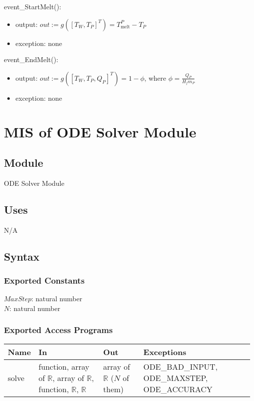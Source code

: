 \documentclass[12pt]{article}
\begin{document}
event\_StartMelt(): 
\begin{itemize}
\item output: $out := g([T_W, T_P]^T) = T_\text{melt}^P - T_P$
\item exception: none
\end{itemize}

event\_EndMelt(): 
\begin{itemize}
\item output: $out := g([T_W, T_P, Q_P]^T) = 1 - \phi$, where $\phi = \frac{Q_P}{H_f m_P}$
\item exception: none
\end{itemize}

\newpage
\section{MIS of ODE Solver Module} \label{ODE}

\subsection{Module}

ODE Solver Module

\subsection{Uses}

N/A

\subsection{Syntax}

\subsubsection{Exported Constants}

$MaxStep$: natural number \\
$N$: natural number

\subsubsection{Exported Access Programs}

\begin{center}
\begin{tabular}{p{2cm} p{4cm} p{4cm} p{4cm}}
\hline
\textbf{Name} & \textbf{In} & \textbf{Out} & \textbf{Exceptions} \\
\hline
solve & function, array of $\mathbb{R}$, array of $\mathbb{R}$, function, $\mathbb{R}$, $\mathbb{R}$ & array of $\mathbb{R}$ ($N$ of them) & ODE\_BAD\_INPUT, ODE\_MAXSTEP, ODE\_ACCURACY \\
\hline 
\end{tabular}
\end{center}
\end{document}
